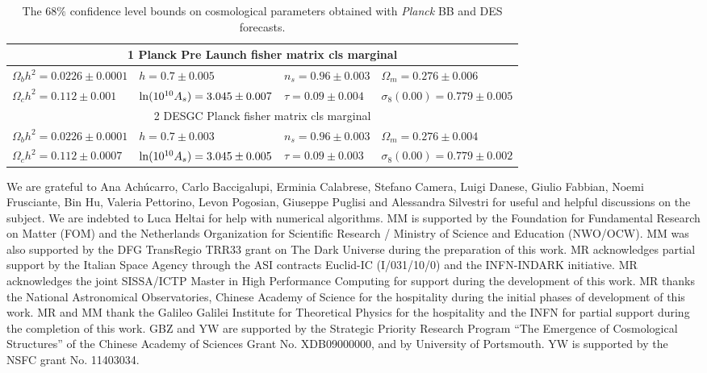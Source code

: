 \documentclass[prd,nofootinbib,showpacs]{revtex4}
\begin{document}
\begin{table}
\centering
\label{Tab:boundstable}
\begin{tabular}{ |l|l|l|l| }
\hline
\multicolumn{4}{|c|}{1 Planck Pre Launch fisher matrix cls marginal} \\[1mm]
\hline
 $\Omega_b h^2 = 0.0226 \pm 0.0001$ & $h = 0.7 \pm 0.005$                        & $n_s = 0.96 \pm 0.003$  & $\Omega_{m} = 0.276 \pm 0.006$       \\[1mm]
 $\Omega_c h^2 = 0.112 \pm 0.001$   & ${\rm{ln}}(10^{10} A_s) = 3.045 \pm 0.007$ & $\tau = 0.09 \pm 0.004$ & $\sigma_{8}(0.00) = 0.779 \pm 0.005$ \\[1mm]
\hline
\multicolumn{4}{|c|}{2 DESGC Planck fisher matrix cls marginal} \\[1mm]
\hline
 $\Omega_b h^2 = 0.0226 \pm 0.0001$ & $h = 0.7 \pm 0.003$                        & $n_s = 0.96 \pm 0.003$  & $\Omega_{m} = 0.276 \pm 0.004$       \\[1mm]
 $\Omega_c h^2 = 0.112 \pm 0.0007$  & ${\rm{ln}}(10^{10} A_s) = 3.045 \pm 0.005$ & $\tau = 0.09 \pm 0.003$ & $\sigma_{8}(0.00) = 0.779 \pm 0.002$ \\[1mm]
\hline
\end{tabular}
\caption{The $68\%$ confidence level bounds on cosmological parameters obtained with {\it Planck} BB and DES forecasts.}
\end{table}


 \newpage

\acknowledgments
%
We are grateful to Ana Ach\'ucarro, Carlo Baccigalupi, Erminia Calabrese, Stefano Camera, Luigi Danese, Giulio Fabbian, Noemi Frusciante, Bin Hu, Valeria Pettorino, Levon Pogosian, Giuseppe Puglisi and Alessandra Silvestri for useful and helpful discussions on the subject. We are indebted to Luca Heltai for help with numerical algorithms.
MM is supported by the Foundation for Fundamental Research on Matter (FOM) and the Netherlands Organization for Scientific Research / Ministry of Science and Education (NWO/OCW). MM was also supported by the DFG TransRegio TRR33 grant on The Dark Universe during the preparation of this work.
MR acknowledges partial support by the Italian Space Agency through the ASI contracts Euclid-IC (I/031/10/0) and the INFN-INDARK initiative.
MR acknowledges the joint SISSA/ICTP Master in High Performance Computing for support during the development of this work.
MR thanks the National Astronomical Observatories, Chinese Academy of Science for the hospitality during the initial phases of development of this work.
MR and MM thank the Galileo Galilei Institute for Theoretical Physics for the hospitality and the INFN for partial support during the completion of this work.
GBZ and YW are supported by the Strategic Priority Research Program ``The Emergence of Cosmological Structures'' of the Chinese Academy of Sciences Grant No. XDB09000000, and by University of Portsmouth. YW is supported by the NSFC grant No. 11403034. 
\end{document}
